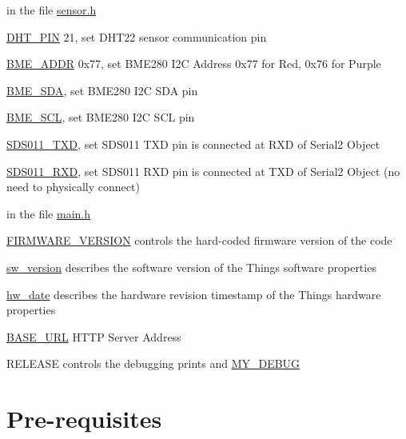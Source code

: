\begin{DoxyItemize}
\item in the file \mbox{\hyperlink{sensor_8h}{sensor.\+h}}
\begin{DoxyItemize}
\item \mbox{\hyperlink{sensor_8h_a661d236dd49f3aef3a2cf46cf6a1405e}{D\+H\+T\+\_\+\+P\+IN}} 21, set D\+H\+T22 sensor communication pin
\item \mbox{\hyperlink{sensor_8h_a9f6149e98e70e1d5be5f0f33921cb7d7}{B\+M\+E\+\_\+\+A\+D\+DR}} 0x77, set B\+M\+E280 I2C Address 0x77 for Red, 0x76 for Purple
\item \mbox{\hyperlink{sensor_8h_ad9e594e426bce833af06dea308dbbf9a}{B\+M\+E\+\_\+\+S\+DA}}, set B\+M\+E280 I2C S\+DA pin
\item \mbox{\hyperlink{sensor_8h_a5db75d8e5f3deda546603b949c520446}{B\+M\+E\+\_\+\+S\+CL}}, set B\+M\+E280 I2C S\+CL pin
\item \mbox{\hyperlink{sensor_8h_a7130f8006502cdaa31094baa3f4dd3fa}{S\+D\+S011\+\_\+\+T\+XD}}, set S\+D\+S011 T\+XD pin is connected at R\+XD of Serial2 Object
\item \mbox{\hyperlink{sensor_8h_ad2b404eb4de525cef31b8413f5d14b13}{S\+D\+S011\+\_\+\+R\+XD}}, set S\+D\+S011 R\+XD pin is connected at T\+XD of Serial2 Object (no need to physically connect)
\end{DoxyItemize}
\item in the file \mbox{\hyperlink{main_8h}{main.\+h}}
\begin{DoxyItemize}
\item \mbox{\hyperlink{main_8h_aa14dc39d52ab121ceb570f1a265385e0}{F\+I\+R\+M\+W\+A\+R\+E\+\_\+\+V\+E\+R\+S\+I\+ON}} controls the hard-\/coded firmware version of the code
\item \mbox{\hyperlink{main_8h_af06baee05280c189592215d5ea08e7ef}{sw\+\_\+version}} describes the software version of the Thing\textquotesingle{}s software properties
\item \mbox{\hyperlink{main_8h_acbd8a4cec684c263a6cc312c70d45ef3}{hw\+\_\+date}} describes the hardware revision timestamp of the Thing\textquotesingle{}s hardware properties
\item \mbox{\hyperlink{main_8h_acbb11c1e34784cf1e3147029f942bfd6}{B\+A\+S\+E\+\_\+\+U\+RL}} H\+T\+TP Server Address
\item R\+E\+L\+E\+A\+SE controls the debugging prints and \mbox{\hyperlink{main_8h_a7e7232f278193dd8684f973ee70ef3f5}{M\+Y\+\_\+\+D\+E\+B\+UG}}
\end{DoxyItemize}
\end{DoxyItemize}\hypertarget{index_prereq}{}\section{Pre-\/requisites}\label{index_prereq}


